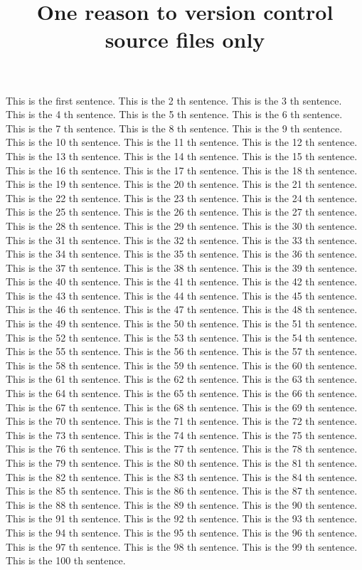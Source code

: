 \documentclass{article}
\title{One reason to version control source files only}
\begin{document}
\maketitle

This is the first sentence.
This is the 2 th sentence.
This is the 3 th sentence.
This is the 4 th sentence.
This is the 5 th sentence.
This is the 6 th sentence.
This is the 7 th sentence.
This is the 8 th sentence.
This is the 9 th sentence.
This is the 10 th sentence.
This is the 11 th sentence.
This is the 12 th sentence.
This is the 13 th sentence.
This is the 14 th sentence.
This is the 15 th sentence.
This is the 16 th sentence.
This is the 17 th sentence.
This is the 18 th sentence.
This is the 19 th sentence.
This is the 20 th sentence.
This is the 21 th sentence.
This is the 22 th sentence.
This is the 23 th sentence.
This is the 24 th sentence.
This is the 25 th sentence.
This is the 26 th sentence.
This is the 27 th sentence.
This is the 28 th sentence.
This is the 29 th sentence.
This is the 30 th sentence.
This is the 31 th sentence.
This is the 32 th sentence.
This is the 33 th sentence.
This is the 34 th sentence.
This is the 35 th sentence.
This is the 36 th sentence.
This is the 37 th sentence.
This is the 38 th sentence.
This is the 39 th sentence.
This is the 40 th sentence.
This is the 41 th sentence.
This is the 42 th sentence.
This is the 43 th sentence.
This is the 44 th sentence.
This is the 45 th sentence.
This is the 46 th sentence.
This is the 47 th sentence.
This is the 48 th sentence.
This is the 49 th sentence.
This is the 50 th sentence.
This is the 51 th sentence.
This is the 52 th sentence.
This is the 53 th sentence.
This is the 54 th sentence.
This is the 55 th sentence.
This is the 56 th sentence.
This is the 57 th sentence.
This is the 58 th sentence.
This is the 59 th sentence.
This is the 60 th sentence.
This is the 61 th sentence.
This is the 62 th sentence.
This is the 63 th sentence.
This is the 64 th sentence.
This is the 65 th sentence.
This is the 66 th sentence.
This is the 67 th sentence.
This is the 68 th sentence.
This is the 69 th sentence.
This is the 70 th sentence.
This is the 71 th sentence.
This is the 72 th sentence.
This is the 73 th sentence.
This is the 74 th sentence.
This is the 75 th sentence.
This is the 76 th sentence.
This is the 77 th sentence.
This is the 78 th sentence.
This is the 79 th sentence.
This is the 80 th sentence.
This is the 81 th sentence.
This is the 82 th sentence.
This is the 83 th sentence.
This is the 84 th sentence.
This is the 85 th sentence.
This is the 86 th sentence.
This is the 87 th sentence.
This is the 88 th sentence.
This is the 89 th sentence.
This is the 90 th sentence.
This is the 91 th sentence.
This is the 92 th sentence.
This is the 93 th sentence.
This is the 94 th sentence.
This is the 95 th sentence.
This is the 96 th sentence.
This is the 97 th sentence.
This is the 98 th sentence.
This is the 99 th sentence.
This is the 100 th sentence.
\end{document}
